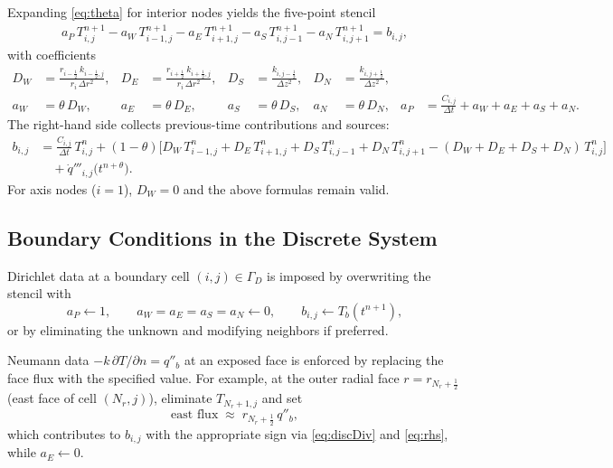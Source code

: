 \documentclass[11pt]{article}
\begin{document}
Expanding \eqref{eq:theta} for interior nodes yields the five-point stencil
\begin{align}
a_P\,T_{i,j}^{n+1}
- a_W\,T_{i-1,j}^{n+1}
- a_E\,T_{i+1,j}^{n+1}
- a_S\,T_{i,j-1}^{n+1}
- a_N\,T_{i,j+1}^{n+1}
= b_{i,j},
\label{eq:interiorStencil}
\end{align}
with coefficients
\begin{align}
D_W &= \frac{r_{i-\frac{1}{2}}\,k_{i-\frac{1}{2},j}}{r_i\,\Delta r^2},&
D_E &= \frac{r_{i+\frac{1}{2}}\,k_{i+\frac{1}{2},j}}{r_i\,\Delta r^2},&
D_S &= \frac{k_{i,j-\frac{1}{2}}}{\Delta z^2},&
D_N &= \frac{k_{i,j+\frac{1}{2}}}{\Delta z^2},\\
a_W &= \theta\,D_W,&
a_E &= \theta\,D_E,&
a_S &= \theta\,D_S,&
a_N &= \theta\,D_N,&
a_P &= \frac{C_{i,j}}{\Delta t} + a_W + a_E + a_S + a_N.
\end{align}
The right-hand side collects previous-time contributions and sources:
\begin{align}
b_{i,j} &=
\frac{C_{i,j}}{\Delta t}\,T_{i,j}^{n}
+ (1-\theta)\Big[
D_W\,T_{i-1,j}^{n}+D_E\,T_{i+1,j}^{n}+D_S\,T_{i,j-1}^{n}+D_N\,T_{i,j+1}^{n}
- (D_W{+}D_E{+}D_S{+}D_N)\,T_{i,j}^{n}
\Big]
\nonumber\\
&\quad + \dot{q}'''_{i,j}\big(t^{n+\theta}\big).
\label{eq:rhs}
\end{align}
For axis nodes ($i=1$), $D_W=0$ and the above formulas remain valid.

\subsection{Boundary Conditions in the Discrete System}

Dirichlet data at a boundary cell $(i,j)\in\Gamma_D$ is imposed by overwriting the stencil with
\begin{equation}
a_P \leftarrow 1,\qquad a_W=a_E=a_S=a_N\leftarrow 0,\qquad b_{i,j}\leftarrow T_b(t^{n+1}),
\end{equation}
or by eliminating the unknown and modifying neighbors if preferred.

Neumann data $-k\,\partial T/\partial n=q''_b$ at an exposed face is enforced by replacing the face flux with the specified value. For example, at the outer radial face $r=r_{N_r+\frac{1}{2}}$ (east face of cell $(N_r,j)$), eliminate $T_{N_r+1,j}$ and set
\begin{equation}
\text{east flux} \;\approx\; r_{N_r+\frac{1}{2}}\,q''_b,
\end{equation}
which contributes to $b_{i,j}$ with the appropriate sign via \eqref{eq:discDiv} and \eqref{eq:rhs}, while $a_E\leftarrow 0$.
\end{document}

